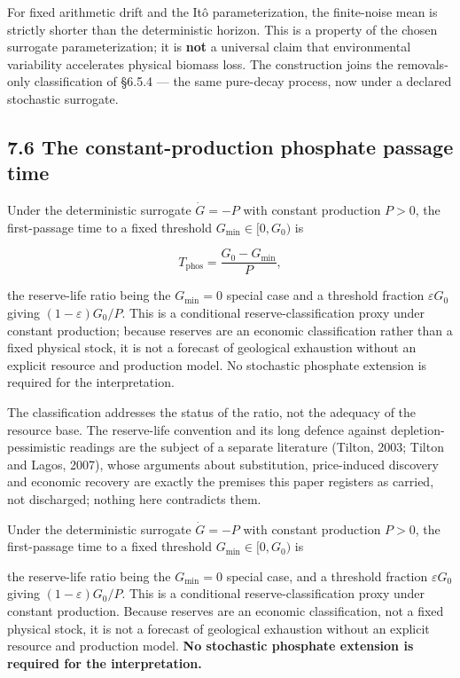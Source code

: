 \documentclass[11pt]{article}
\begin{document}
For fixed arithmetic drift and the It\^{o} parameterization, the finite-noise mean is strictly shorter than the deterministic horizon. This is a property of the chosen surrogate parameterization; it is \textbf{not} a universal claim that environmental variability accelerates physical biomass loss. The construction joins the removals-only classification of \S6.5.4 --- the same pure-decay process, now under a declared stochastic surrogate.

\subsection*{7.6 The constant-production phosphate passage time}\label{76-the-constant-production-phosphate-passage-time}

Under the deterministic surrogate \(\dot G = -P\) with constant production \(P > 0\), the first-passage time to a fixed threshold \(G_{\min} \in [0, G_0)\) is 

$$T_{\mathrm{phos}} = \frac{G_0 - G_{\min}}{P},$$

 the reserve-life ratio being the \(G_{\min} = 0\) special case and a threshold fraction \(\varepsilon G_0\) giving \((1-\varepsilon)G_0/\allowbreak{}P\). This is a conditional reserve-classification proxy under constant production; because reserves are an economic classification rather than a fixed physical stock, it is not a forecast of geological exhaustion without an explicit resource and production model. No stochastic phosphate extension is required for the interpretation.

The classification addresses the status of the ratio, not the adequacy of the resource base. The reserve-life convention and its long defence against depletion-pessimistic readings are the subject of a separate literature (Tilton, 2003; Tilton and Lagos, 2007), whose arguments about substitution, price-induced discovery and economic recovery are exactly the premises this paper registers as carried, not discharged; nothing here contradicts them.

Under the deterministic surrogate \(\dot G=-P\) with constant production \(P>0\), the first-passage time to a fixed threshold \(G_{\min}\in[0,G_0)\) is

the reserve-life ratio being the \(G_{\min}=0\) special case, and a threshold fraction \(\varepsilon G_0\) giving \((1-\varepsilon)G_0/\allowbreak{}P\). This is a conditional reserve-classification proxy under constant production. Because reserves are an economic classification, not a fixed physical stock, it is not a forecast of geological exhaustion without an explicit resource and production model. \textbf{No stochastic phosphate extension is required for the interpretation.}
\end{document}
